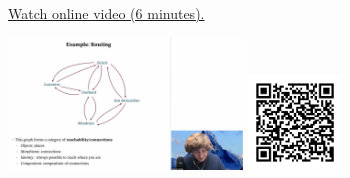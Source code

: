 
\begin{minipage}{10cm}
    \href{https://act4e-spring21.netlify.app/videos/spring2021-enrichment:intro-exa-enrich.html}{Watch online video (6 minutes).}
        
    \href{https://act4e-spring21.netlify.app/videos/spring2021-enrichment:intro-exa-enrich.html}{\includegraphics[height=3.5cm]{spring2021-enrichment:intro-exa-enrich/thumbnails.jpg}}
    \href{https://act4e-spring21.netlify.app/videos/spring2021-enrichment:intro-exa-enrich.html}{\includegraphics[height=2.5cm]{spring2021-enrichment:intro-exa-enrich/qrcode.png}}
\end{minipage}
